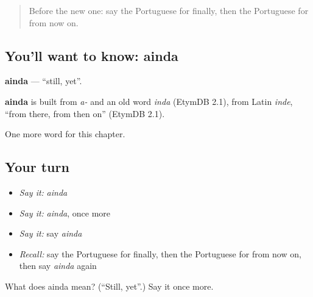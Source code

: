 \label{lesson:PT-C150-ainda}



\begin{quote}
Before the new one: say the Portuguese for finally, then the Portuguese for from now on.
\end{quote}

\subsection*{You'll want to know: ainda}
\textbf{ainda} — \textquotedblleft{}still, yet\textquotedblright{}.

\begin{cousinweb}
\textbf{ainda} is built from \emph{a-} and an old word \emph{inda} (EtymDB 2.1), from Latin \emph{inde}, \textquotedblleft{}from there, from then on\textquotedblright{} (EtymDB 2.1).
\end{cousinweb}

\begin{grammarlens}[title={What you've built}]
One more word for this chapter.
\end{grammarlens}

\subsection*{Your turn}
\begin{itemize}
\raggedright
  \item \emph{Say it:} \emph{ainda}
  \item \emph{Say it:} \emph{ainda}, once more
  \item \emph{Say it:} say \emph{ainda}
  \item \emph{Recall:} say the Portuguese for finally, then the Portuguese for from now on, then say \emph{ainda} again
\end{itemize}

\begin{tcolorbox}[breakable,colback=teal!4,colframe=teal!35!black,title={Before you move on}]
What does ainda mean? (\textquotedblleft{}Still, yet\textquotedblright{}.) Say it once more.
\end{tcolorbox}
